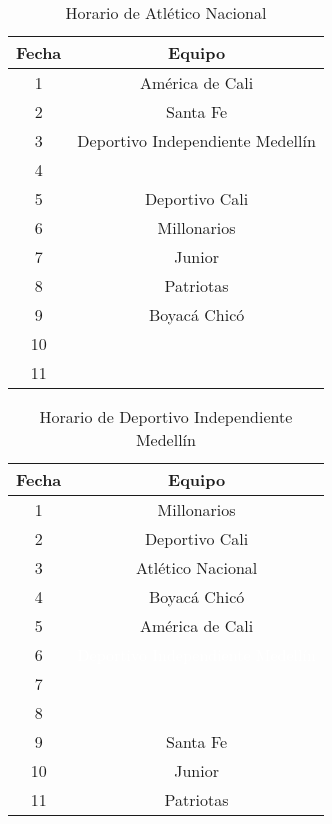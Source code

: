 \documentclass[11pt]{article}
\begin{document}
\begin{multicols}{2}
            \begin{table}[H]
                \centering
                \begin{tabular}{|c||c|}
                    \hline
                    Fecha & Equipo\\ \hline
                    1 & América de Cali \\ \hline
                    2 & Santa Fe \\ \hline
                    3 & Deportivo Independiente Medellín \\ \hline
                    4 &  \\ \hline
                    5 & Deportivo Cali \\ \hline
                    6 & Millonarios \\ \hline
                    7 & Junior \\ \hline
                    8 & Patriotas \\ \hline
                    9 & Boyacá Chicó\\ \hline
                    10 &  \\ \hline
                    11 &  \\ \hline
                \end{tabular} 
                \caption{Horario de Atlético Nacional}
            \end{table}

            \begin{table}[H]
                \centering
                \begin{tabular}{|c||c|}
                    \hline
                    Fecha & Equipo\\ \hline
                    1 & Millonarios \\ \hline
                    2 & Deportivo Cali \\ \hline
                    3 & Atlético Nacional \\ \hline
                    4 & Boyacá Chicó \\ \hline
                    5 & América de Cali \\ \hline
                    6 & \textcolor{white}{Deportivo Independiente Medellín} \\ \hline
                    7 &  \\ \hline
                    8 &  \\ \hline
                    9 & Santa Fe\\ \hline
                    10 & Junior \\ \hline
                    11 & Patriotas \\ \hline
                \end{tabular} 
                \caption{Horario de Deportivo Independiente Medellín}
            \end{table}


\end{multicols}
\end{document}
